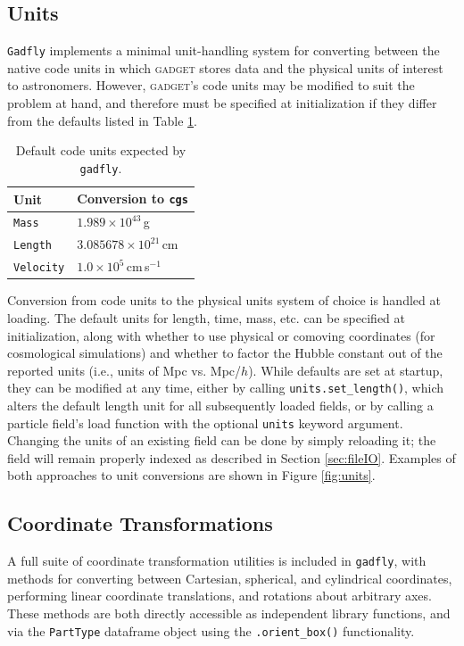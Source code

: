 \documentclass{emulateapj}
\newcommand{\code}[1]{\texttt{#1}}
\begin{document}
\subsection{Units}
\label{sec:units}
\code{Gadfly} implements a minimal unit-handling system for converting between the native code units in which \textsc{gadget} stores data and the physical units of interest to astronomers.  
However, \textsc{gadget}'s code units may be modified to suit the problem at hand, and therefore must be specified at initialization if they differ from the defaults listed in Table \ref{code_unit_defaults}.
\begin{table}[h!]
    \centering
    \caption{Default code units expected by \code{gadfly}.}
    \label{code_unit_defaults}
    \begin{tabular}{ll}
        \hline
        Unit & Conversion to \verb|cgs|\\
        \hline
        \verb|Mass| &  $1.989\times10^{43}\,$g\\ 
        \verb|Length| & $3.085678\times10^{21}\,$cm \\ 
        \verb|Velocity| & $1.0\times10^5\,$cm$\,$s$^{-1}$ \\ 
    \end{tabular} 
\end{table}
Conversion from code units to the physical units system of choice is handled at loading.
The default units for length, time, mass, etc. can be specified at initialization, along with whether to use physical or comoving coordinates (for cosmological simulations) and whether to factor the Hubble constant out of the reported units (i.e., units of Mpc vs. Mpc/$h$).
While defaults are set at startup, they can be modified at any time, either by calling \verb|units.set_length()|, which alters the default length unit for all subsequently loaded fields, or by calling a particle field's load function with the optional \code{units} keyword argument.  
Changing the units of an existing field can be done by simply reloading it; the field will remain properly indexed as described in Section \ref{sec:fileIO}. Examples of both approaches to unit conversions are shown in Figure \ref{fig:units}.

\subsection{Coordinate Transformations}
\label{sec:coords}
A full suite of coordinate transformation utilities is included in \code{gadfly}, with methods for converting between Cartesian, spherical, and cylindrical coordinates, performing linear coordinate translations, and rotations about arbitrary axes.  
These methods are both directly accessible as independent library functions, and via the \code{PartType} dataframe object using the \verb|.orient_box()| functionality.
\end{document}
